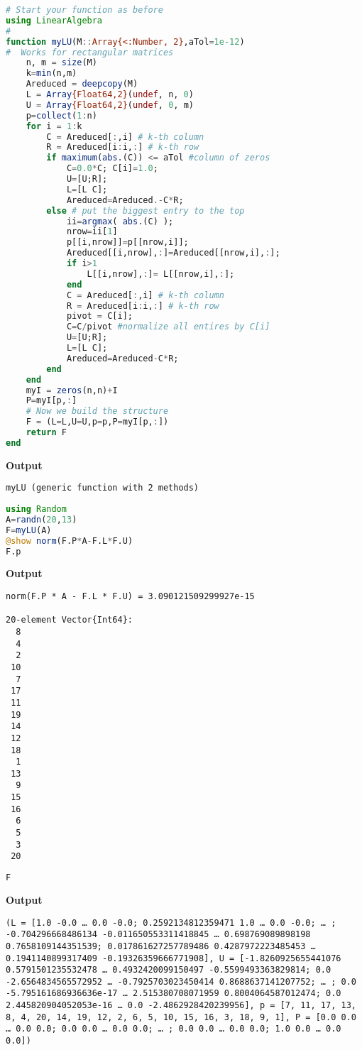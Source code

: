 \begin{lstlisting}[language=Julia,style=mystyle]
# Start your function as before
using LinearAlgebra
#
function myLU(M::Array{<:Number, 2},aTol=1e-12)
#  Works for rectangular matrices  
    n, m = size(M)
    k=min(n,m)
    Areduced = deepcopy(M)
    L = Array{Float64,2}(undef, n, 0)
    U = Array{Float64,2}(undef, 0, m)
    p=collect(1:n)     
    for i = 1:k
        C = Areduced[:,i] # k-th column
        R = Areduced[i:i,:] # k-th row
        if maximum(abs.(C)) <= aTol #column of zeros
            C=0.0*C; C[i]=1.0;
            U=[U;R];  
            L=[L C];
            Areduced=Areduced.-C*R;
        else # put the biggest entry to the top  
            ii=argmax( abs.(C) );
            nrow=ii[1] 
            p[[i,nrow]]=p[[nrow,i]];
            Areduced[[i,nrow],:]=Areduced[[nrow,i],:];
            if i>1
                L[[i,nrow],:]= L[[nrow,i],:];
            end
            C = Areduced[:,i] # k-th column
            R = Areduced[i:i,:] # k-th row
            pivot = C[i];
            C=C/pivot #normalize all entires by C[i]
            U=[U;R]; 
            L=[L C];
            Areduced=Areduced-C*R;
        end
    end
    myI = zeros(n,n)+I
    P=myI[p,:]
    # Now we build the structure
    F = (L=L,U=U,p=p,P=myI[p,:])
    return F
end
\end{lstlisting}
\textbf{Output} 
\begin{verbatim}
myLU (generic function with 2 methods)
\end{verbatim}


\begin{lstlisting}[language=Julia,style=mystyle]
using Random
A=randn(20,13)
F=myLU(A)
@show norm(F.P*A-F.L*F.U)
F.p
\end{lstlisting}
\textbf{Output} 
\begin{verbatim}
norm(F.P * A - F.L * F.U) = 3.090121509299927e-15

20-element Vector{Int64}:
  8
  4
  2
 10
  7
 17
 11
 19
 14
 12
 18
  1
 13
  9
 15
 16
  6
  5
  3
 20
\end{verbatim}


\begin{lstlisting}[language=Julia,style=mystyle]
F
\end{lstlisting}
\textbf{Output} 
\begin{verbatim}
(L = [1.0 -0.0 … 0.0 -0.0; 0.2592134812359471 1.0 … 0.0 -0.0; … ; -0.704296668486134 -0.011650553311418845 … 0.698769089898198 0.7658109144351539; 0.017861627257789486 0.4287972223485453 … 0.1941140899317409 -0.19326359666771908], U = [-1.8260925655441076 0.5791501235532478 … 0.4932420099150497 -0.5599493363829814; 0.0 -2.6564834565572952 … -0.7925703023450414 0.8688637141207752; … ; 0.0 -5.795161686936636e-17 … 2.515380708071959 0.8004064587012474; 0.0 2.445820904052053e-16 … 0.0 -2.4862928420239956], p = [7, 11, 17, 13, 8, 4, 20, 14, 19, 12, 2, 6, 5, 10, 15, 16, 3, 18, 9, 1], P = [0.0 0.0 … 0.0 0.0; 0.0 0.0 … 0.0 0.0; … ; 0.0 0.0 … 0.0 0.0; 1.0 0.0 … 0.0 0.0])
\end{verbatim}


